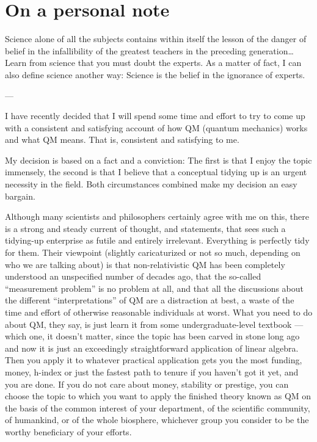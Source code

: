 \documentclass[12pt]{article}
\begin{document}
\section{On a personal note}
\label{sec:personal}

\begin{flushright}
\parbox[h]{5in}{\small{
Science alone of all the subjects contains within itself the lesson of 
the danger of belief in the infallibility of the greatest teachers in the 
preceding generation\ldots Learn from science that you must doubt the experts. 
As a matter of fact, I can also define science another way: Science is the 
belief in the ignorance of experts.
\begin{flushright}
\vspace{-23.5pt}
--- \cite{Feynman1968}
\end{flushright}
}}
\end{flushright}

I have recently decided that I will spend some time and effort to try to come
up with a consistent and satisfying account of how QM (quantum mechanics)
works and what QM means. That is, consistent and satisfying to me.

My decision is based on a fact and a conviction: The first is that I enjoy the
topic immensely, the second is that I believe that a conceptual tidying up is
an urgent necessity in the field. Both circumstances combined make my decision
an easy bargain.

Although many scientists and philosophers certainly agree with me on this,
there is a strong and steady current of thought, and statements, that sees
such a tidying-up enterprise as futile and entirely irrelevant. Everything is
perfectly tidy for them. Their viewpoint (slightly caricaturized or not so
much, depending on who we are talking about) is that non-relativistic QM has
been completely understood an unspecified number of decades ago, that the
so-called ``measurement problem'' is no problem at all, and that all the
discussions about the different ``interpretations'' of QM are a distraction at
best, a waste of the time and effort of otherwise reasonable individuals at
worst. What you need to do about QM, they say, is just learn it from some
undergraduate-level textbook ---which one, it doesn't matter, since the topic
has been carved in stone long ago and now it is just an exceedingly
straightforward application of linear algebra. Then you apply it to whatever
practical application gets you the most funding, money, h-index or just the
fastest path to tenure if you haven't got it yet, and you are done. If you do
not care about money, stability or prestige, you can choose the topic to which
you want to apply the finished theory known as QM on the basis of the common
interest of your department, of the scientific community, of humankind, or of
the whole biosphere, whichever group you consider to be the worthy beneficiary
of your efforts.
\end{document}
